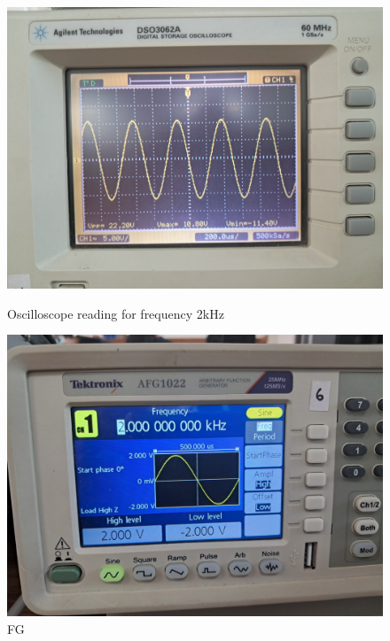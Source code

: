 \documentclass[a4paper,12pt]{article}
\begin{document}
\begin{figure}[H]
    \centering
    \begin{minipage}[b]{0.45\textwidth}
        \centering
        \includegraphics[width=\textwidth]{fig/lp/2ko.jpeg}
        \caption{Oscilloscope reading for frequency 2kHz}
    \end{minipage}
    \hfill
    \begin{minipage}[b]{0.45\textwidth}
        \centering
        \includegraphics[width=\textwidth]{fig/lp/2k.jpeg}
        \caption{FG}
    \end{minipage}
\end{figure}
\end{document}
